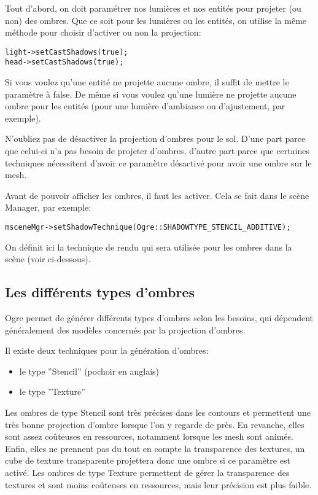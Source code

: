 \documentclass[10pt,a4paper]{report}
\begin{document}
Tout d'abord, on doit param\'etrer nos lumi\`eres et nos entit\'es pour projeter (ou non) des ombres.
Que ce soit pour les lumi\`eres ou les entit\'es, on utilise la m\^eme m\'ethode pour choisir d'activer ou non la projection:

\begin{lstlisting}
light->setCastShadows(true);
head->setCastShadows(true);
\end{lstlisting}


Si vous voulez qu'une entit\'e ne projette aucune ombre, il suffit de mettre le param\`etre \`{a} false. De m\^eme si vous voulez qu'une lumi\`ere ne projette aucune ombre pour les entit\'es (pour une lumi\`ere d'ambiance ou d'ajustement, par exemple).

N'oubliez pas de d\'esactiver la projection d'ombres pour le sol. D'une part parce que celui-ci n'a pas besoin de projeter d'ombres, d'autre part parce que certaines techniques n\'ecessitent d'avoir ce param\`etre d\'esactiv\'e pour avoir une ombre sur le mesh.

Avant de pouvoir afficher les ombres, il faut les activer. Cela se fait dans le sc\`ene Manager, par exemple:

\begin{lstlisting}
msceneMgr->setShadowTechnique(Ogre::SHADOWTYPE_STENCIL_ADDITIVE);
\end{lstlisting}



On d\'efinit ici la technique de rendu qui sera utilis\'ee pour les ombres dans la sc\`ene (voir ci-dessous).




\subsection{Les diff\'erents types d'ombres}

Ogre permet de g\'en\'erer diff\'erents types d'ombres selon les besoins, qui d\'ependent g\'en\'eralement des mod\`eles concern\'es par la projection d'ombres.

Il existe deux techniques pour la g\'en\'eration d'ombres:
\begin{itemize}
\item le type ''Stencil'' (pochoir en anglais)
\item le type ''Texture''
\end{itemize}

Les ombres de type Stencil sont tr\`es pr\'ecises dans les contours et permettent une tr\`es bonne projection d'ombre lorsque l'on y regarde de pr\`es. En revanche, elles sont assez co\^uteuses en ressources, notamment lorsque les mesh sont anim\'es. Enfin, elles ne prennent pas du tout en compte la transparence des textures, un cube de texture transparente projettera donc une ombre si ce param\`etre est activ\'e.
Les ombres de type Texture permettent de g\'erer la transparence des textures et sont moins co\^uteuses en ressources, mais leur pr\'ecision est plus faible.
\end{document}
